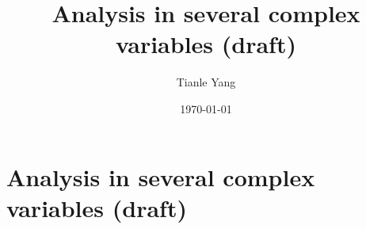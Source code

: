 \documentclass{noteformyself}
\title{Analysis in several complex variables (draft)}
\author{Tianle Yang}
\date{\today}
\begin{document}
    \maketitle
    \section{Analysis in several complex variables (draft)}



\end{document}
